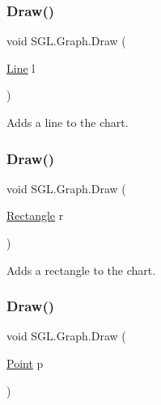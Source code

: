 \subsubsection{\texorpdfstring{Draw()}{Draw()}\hspace{0.1cm}{\footnotesize\ttfamily [3/6]}}
{\footnotesize\ttfamily void S\+G\+L.\+Graph.\+Draw (\begin{DoxyParamCaption}\item[{\mbox{\hyperlink{class_s_g_l_1_1_line}{Line}}}]{l }\end{DoxyParamCaption})\hspace{0.3cm}{\ttfamily [inline]}}



Adds a line to the chart. 

\mbox{\label{class_s_g_l_1_1_graph_ab9f18f59b4f05c9a3dcb2277634532d5}} 
\subsubsection{\texorpdfstring{Draw()}{Draw()}\hspace{0.1cm}{\footnotesize\ttfamily [4/6]}}
{\footnotesize\ttfamily void S\+G\+L.\+Graph.\+Draw (\begin{DoxyParamCaption}\item[{\mbox{\hyperlink{class_s_g_l_1_1_rectangle}{Rectangle}}}]{r }\end{DoxyParamCaption})\hspace{0.3cm}{\ttfamily [inline]}}



Adds a rectangle to the chart. 

\mbox{\label{class_s_g_l_1_1_graph_a2ef792871c730c14e38d7b33e97b7540}} 
\subsubsection{\texorpdfstring{Draw()}{Draw()}\hspace{0.1cm}{\footnotesize\ttfamily [5/6]}}
{\footnotesize\ttfamily void S\+G\+L.\+Graph.\+Draw (\begin{DoxyParamCaption}\item[{\mbox{\hyperlink{struct_s_g_l_1_1_point}{Point}}}]{p }\end{DoxyParamCaption})\hspace{0.3cm}{\ttfamily [inline]}}



